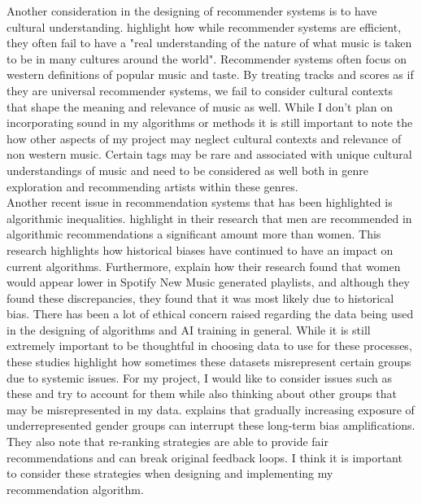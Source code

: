 \documentclass[10pt,twocolumn]{article}
\begin{document}
\indent Another consideration in the designing of recommender systems is to have cultural understanding. \textcite{BornCurationCulture} highlight how while recommender systems are efficient, they often fail to have a "real understanding of the nature of what music is taken to be in many cultures around the world". Recommender systems often focus on western definitions of popular music and taste. By treating tracks and scores as if they are universal recommender systems, we fail to consider cultural contexts that shape the meaning and relevance of music as well. While I don't plan on incorporating sound in my algorithms or methods it is still important to note the how other aspects of my project may neglect cultural contexts and relevance of non western music. Certain tags may be rare and associated with unique cultural understandings of music and need to be considered as well both in genre exploration and recommending artists within these genres.\\

\indent Another recent issue in recommendation systems that has been highlighted is algorithmic inequalities. \textcite{FerraroGenderImbalance} highlight in their research that men are recommended in algorithmic recommendations a significant amount more than women. This research highlights how historical biases have continued to have an impact on current algorithms. Furthermore, \textcite{AguilarGender} explain how their research found that women would appear lower in Spotify New Music generated playlists, and although they found these discrepancies, they found that it was most likely due to historical bias. There has been a lot of ethical concern raised regarding the data being used in the designing of algorithms and AI training in general. While it is still extremely important to be thoughtful in choosing data to use for these processes, these studies highlight how sometimes these datasets misrepresent certain groups due to systemic issues. For my project, I would like to consider issues such as these and try to account for them while also thinking about other groups that may be misrepresented in my data. \textcite{FerraroGenderImbalance} explains that gradually increasing exposure of underrepresented gender groups can interrupt these long-term bias amplifications. They also note that re-ranking strategies are able to provide fair recommendations and can break original feedback loops. I think it is important to consider these strategies when designing and implementing my recommendation algorithm.\\
\end{document}
